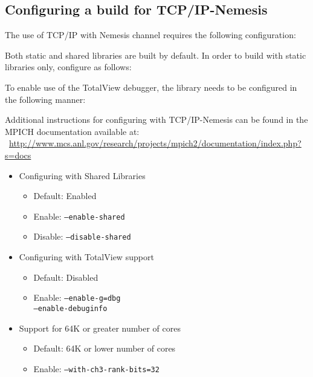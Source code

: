 \subsection{Configuring a build for TCP/IP-Nemesis}
\label{subsec:config-tcpip_nemesis}

The use of TCP/IP with Nemesis channel requires the following configuration:


Both static and shared libraries are built by default. In order to build with static libraries only, configure as follows:


To enable use of the TotalView debugger, the library needs to be configured
in the following manner:


Additional instructions for configuring with TCP/IP-Nemesis can be found in the MPICH
documentation available at:
~\href{http://www.mcs.anl.gov/research/projects/mpich2/documentation/index.php?s=docs}{http://www.mcs.anl.gov/research/projects/mpich2/documentation/index.php?s=docs}

\begin{itemize}
	\item Configuring with Shared Libraries
		\begin{itemize}
			\item Default: Enabled
			\item Enable: \texttt{--enable-shared}
            \item Disable: \texttt{--disable-shared}
		\end{itemize}

	\item Configuring with TotalView support
		\begin{itemize}
			\item Default: Disabled
			\item Enable: \texttt{--enable-g=dbg \\
                                   --enable-debuginfo}
		\end{itemize}
	\item Support for 64K or greater number of cores
		\begin{itemize}
			\item Default: 64K or lower number of cores
			\item Enable: \texttt{--with-ch3-rank-bits=32}
		\end{itemize}
\end{itemize}

